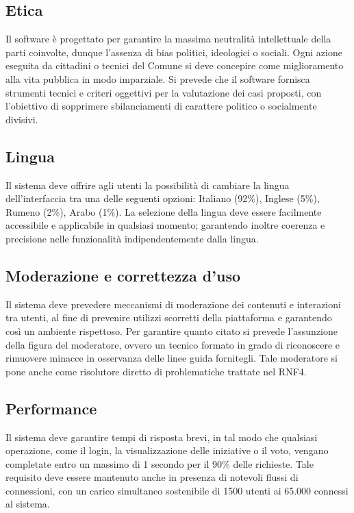 \subsection{Etica}
Il software è progettato per garantire la massima neutralità intellettuale della parti coinvolte, dunque l'assenza di bias politici, ideologici o sociali. Ogni azione eseguita da cittadini o tecnici del Comune si deve concepire come miglioramento alla vita pubblica in modo imparziale. Si prevede che il software fornisca strumenti tecnici e criteri oggettivi per la valutazione dei casi proposti, con l'obiettivo di sopprimere sbilanciamenti di carattere politico o socialmente divisivi. 

\subsection{Lingua}
Il sistema deve offrire agli utenti la possibilità di cambiare la lingua dell’interfaccia tra una delle seguenti opzioni: Italiano (92{\%}), Inglese (5{\%}), Rumeno (2{\%}), Arabo (1{\%}). La selezione della lingua deve essere facilmente accessibile e applicabile in qualsiasi momento; garantendo inoltre coerenza e precisione nelle funzionalità indipendentemente dalla lingua.

\subsection{Moderazione e correttezza d'uso}
Il sistema deve prevedere meccanismi di moderazione dei contenuti e interazioni tra utenti, al fine di prevenire utilizzi scorretti della piattaforma e garantendo così un ambiente rispettoso. Per garantire quanto citato si prevede l'assunzione della figura del moderatore, ovvero un tecnico formato in grado di riconoscere e rimuovere minacce in osservanza delle linee guida fornitegli. Tale moderatore si pone anche come risolutore diretto di problematiche trattate nel RNF4.

\subsection{Performance}
Il sistema deve garantire tempi di risposta brevi, in tal modo che qualsiasi operazione, come il login, la visualizzazione delle iniziative o il voto, vengano completate entro un massimo di 1 secondo per il 90{\%} delle richieste. Tale requisito deve essere mantenuto anche in presenza di notevoli flussi di connessioni, con un carico simultaneo sostenibile di 1500 utenti ai 65.000 connessi al sistema.


